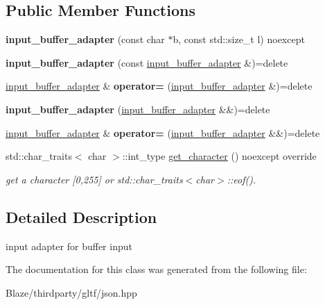 \subsection*{Public Member Functions}
\begin{DoxyCompactItemize}
\item 
\mbox{\label{classnlohmann_1_1detail_1_1input__buffer__adapter_ad9b912fabdcb53de255e8c444d625ac3}} 
{\bfseries input\+\_\+buffer\+\_\+adapter} (const char $\ast$b, const std\+::size\+\_\+t l) noexcept
\item 
\mbox{\label{classnlohmann_1_1detail_1_1input__buffer__adapter_ada76d7b75c5d6b989af0e18687ef07b6}} 
{\bfseries input\+\_\+buffer\+\_\+adapter} (const \hyperlink{classnlohmann_1_1detail_1_1input__buffer__adapter}{input\+\_\+buffer\+\_\+adapter} \&)=delete
\item 
\mbox{\label{classnlohmann_1_1detail_1_1input__buffer__adapter_a0871125057d993684ba8e45fb2b8a76b}} 
\hyperlink{classnlohmann_1_1detail_1_1input__buffer__adapter}{input\+\_\+buffer\+\_\+adapter} \& {\bfseries operator=} (\hyperlink{classnlohmann_1_1detail_1_1input__buffer__adapter}{input\+\_\+buffer\+\_\+adapter} \&)=delete
\item 
\mbox{\label{classnlohmann_1_1detail_1_1input__buffer__adapter_ab6bc6bb785408b74af284a5b7544d9dc}} 
{\bfseries input\+\_\+buffer\+\_\+adapter} (\hyperlink{classnlohmann_1_1detail_1_1input__buffer__adapter}{input\+\_\+buffer\+\_\+adapter} \&\&)=delete
\item 
\mbox{\label{classnlohmann_1_1detail_1_1input__buffer__adapter_a19bb3ff68048a2fc8ecc41a013af37ae}} 
\hyperlink{classnlohmann_1_1detail_1_1input__buffer__adapter}{input\+\_\+buffer\+\_\+adapter} \& {\bfseries operator=} (\hyperlink{classnlohmann_1_1detail_1_1input__buffer__adapter}{input\+\_\+buffer\+\_\+adapter} \&\&)=delete
\item 
\mbox{\label{classnlohmann_1_1detail_1_1input__buffer__adapter_ae9e195b04f3551fafb0925aafba00124}} 
std\+::char\+\_\+traits$<$ char $>$\+::int\+\_\+type \hyperlink{classnlohmann_1_1detail_1_1input__buffer__adapter_ae9e195b04f3551fafb0925aafba00124}{get\+\_\+character} () noexcept override
\begin{DoxyCompactList}\small\item\em get a character \mbox{[}0,255\mbox{]} or std\+::char\+\_\+traits$<$char$>$\+::eof(). \end{DoxyCompactList}\end{DoxyCompactItemize}


\subsection{Detailed Description}
input adapter for buffer input 

The documentation for this class was generated from the following file\+:\begin{DoxyCompactItemize}
\item 
Blaze/thirdparty/gltf/json.\+hpp\end{DoxyCompactItemize}
